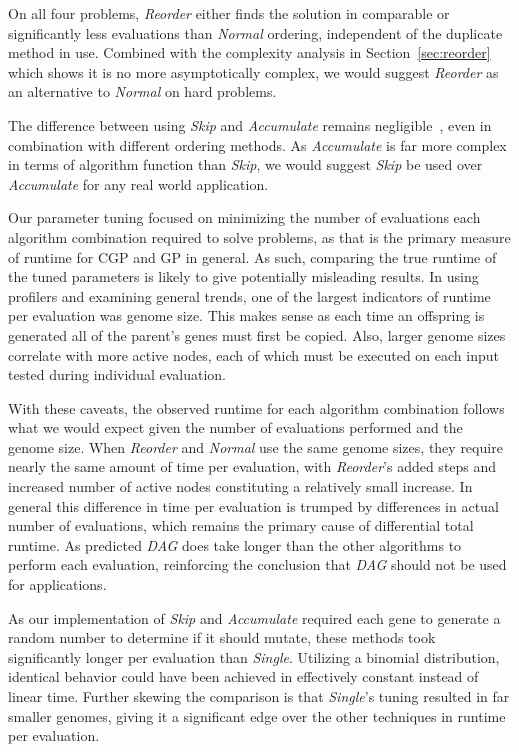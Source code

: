 \documentclass[journal]{IEEEtran}
\begin{document}
On all four problems, \emph{Reorder} either finds the solution in comparable
or significantly less evaluations than \emph{Normal} ordering, independent of
the duplicate method in use.  Combined with the complexity analysis in
Section~\ref{sec:reorder} which shows it is no more asymptotically complex,
we would suggest \emph{Reorder} as an alternative to \emph{Normal} on hard
problems.

The difference between using \emph{Skip} and \emph{Accumulate} remains
negligible~\cite{goldman:2013:cgpwaste}, even in combination with different ordering
methods.  As \emph{Accumulate} is far more complex in terms of algorithm function
than \emph{Skip}, we would suggest \emph{Skip} be used over \emph{Accumulate} for
any real world application.

Our parameter tuning focused on minimizing the number of evaluations each algorithm
combination required to solve problems, as that is the primary measure of runtime
for CGP and GP in general.  As such, comparing the true runtime of the tuned parameters
is likely to give potentially misleading results.  In using profilers and examining
general trends, one of the largest indicators of runtime per evaluation was genome size.
This makes sense as each time an offspring is generated all of the parent's genes
must first be copied.  Also, larger genome sizes correlate with more active nodes,
each of which must be executed on each input tested during individual evaluation.

With these caveats, the observed runtime for each algorithm combination follows
what we would expect given the number of evaluations performed and the genome size.
When \emph{Reorder} and \emph{Normal} use the same genome sizes, they require
nearly the same amount of time per evaluation, with \emph{Reorder}'s added
steps and increased number of active nodes constituting a relatively small increase.
In general this difference in time per evaluation is trumped by differences in
actual number of evaluations, which remains the primary cause of differential total runtime.
As predicted \emph{DAG} does take longer than the other algorithms to perform each evaluation,
reinforcing the conclusion that \emph{DAG} should not be used for applications.

As our implementation of \emph{Skip} and \emph{Accumulate} required each gene
to generate a random number to determine if it should mutate, these methods took
significantly longer per evaluation than \emph{Single}.  Utilizing a binomial
distribution, identical behavior could have been achieved in effectively constant
instead of linear time.  Further skewing the comparison is that \emph{Single}'s
tuning resulted in far smaller genomes, giving it a significant edge over the other
techniques in runtime per evaluation.
\end{document}
